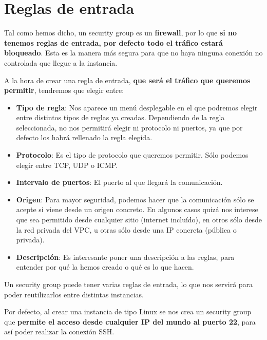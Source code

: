 \section{Reglas de entrada}

Tal como hemos dicho, un security group es un \textbf{firewall}, por lo que \textbf{si no tenemos reglas de entrada, por defecto todo el tráfico estará bloqueado}. Esta es la manera más segura para que no haya ninguna conexión no controlada que llegue a la instancia.


A la hora de crear una regla de entrada, \textbf{que será el tráfico que queremos permitir}, tendremos que elegir entre:

\begin{itemize}
	\item \textbf{Tipo de regla}: Nos aparece un menú desplegable en el que podremos elegir entre distintos tipos de reglas ya creadas. Dependiendo de la regla seleccionada, no nos permitirá elegir ni protocolo ni puertos, ya que por defecto los habrá rellenado la regla elegida.
	\item \textbf{Protocolo}: Es el tipo de protocolo que queremos permitir. Sólo podemos elegir entre TCP, UDP o ICMP.
	\item \textbf{Intervalo de puertos}: El puerto al que llegará la comunicación.
	\item \textbf{Origen}: Para mayor seguridad, podemos hacer que la comunicación sólo se acepte si viene desde un origen concreto. En algunos casos quizá nos interese que sea permitido desde cualquier sitio (internet incluído), en otros sólo desde la red privada del VPC, u otras sólo desde una IP concreta (pública o privada).


	\item \textbf{Descripción}: Es interesante poner una descripción a las reglas, para entender por qué la hemos creado o qué es lo que hacen.
\end{itemize}

Un security group puede tener varias reglas de entrada, lo que nos servirá para poder reutilizarlos entre distintas instancias.

Por defecto, al crear una instancia de tipo Linux se nos crea un security group que \textbf{permite el acceso desde cualquier IP del mundo al puerto 22}, para así poder realizar la conexión SSH.

